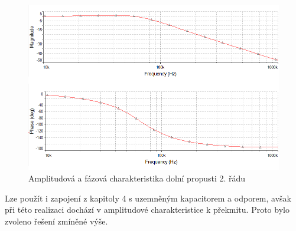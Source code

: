 \documentclass[twoside]{article}
\begin{document}
\begin{figure}[H]
\centering
\includegraphics[scale=0.6]{17072.png}
\caption{Amplitudová a fázová charakteristika dolní propusti 2. řádu}
\end{figure}
\noindent Lze použít i zapojení z kapitoly 4 s uzemněným kapacitorem a odporem, avšak při této realizaci dochází v amplitudové charakteristice k překmitu. Proto bylo zvoleno řešení zmíněné výše.
\end{document}

